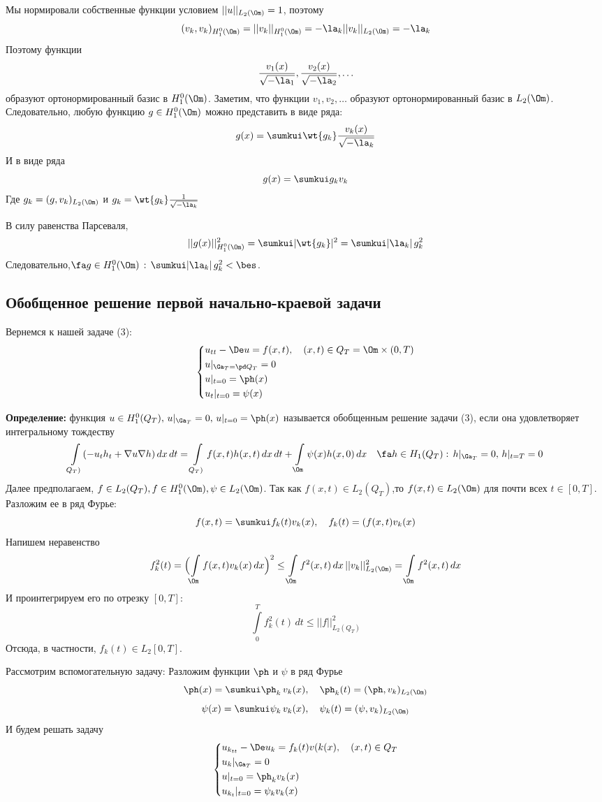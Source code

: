 \documentclass[a4paper,draft]{article}
\begin{document}
Мы нормировали собственные функции условием
$||u||_{L_2(\Om)}=1$, поэтому
$$
(v_k,v_k)_{H_1^0(\Om)}=||v_k||_{H_1^0(\Om)}=-\la_k
||v_k||_{L_2(\Om)}=-\la_k
$$
Поэтому функции
$$
\frac {v_1(x)}{\sqrt{-\la_1}}, \frac
{v_2(x)}{\sqrt{-\la_2}} ,\ldots
$$
образуют ортонормированный базис в $H_1^0(\Om)$. Заметим, что
функции $v_1,v_2,\ldots$ образуют ортонормированный базис в
$L_2(\Om)$. Следовательно, любую функцию $g\in H_1^0(\Om)$
можно представить в виде ряда:
$$
g(x)=\sumkui \wt{g_k} \frac
{v_k(x)}{\sqrt{-\la_k}}
$$
И в виде ряда
$$
g(x)=\sumkui  g_k v_k
$$
Где $g_k=(g,v_k)_{L_2(\Om)}$ и $g_k = \wt{g_k} \frac
1{\sqrt{-\la_k}}$

В силу равенства Парсеваля,
$$
||g(x)||^2_{H_1^0(\Om)}=\sumkui  |\wt{g_k}|^2 =
\sumkui  |\la_k|\, g_k^2
$$
Следовательно,$ \fa g\in H_1^0(\Om)\,: \, \sumkui
|\la_k|\, g_k^2 < \bes$.


\subsection {Обобщенное решение первой начально-краевой задачи}
Вернемся к нашей задаче (3):
$$
 \left\{
\begin{aligned}
&u_{tt}-\De u =f(x,t),\quad (x,t)\in Q_T=\Om \times (0,T)\\
&u|_{\Ga_T=\pd Q_T}= 0\\
&u|_{t=0}=\ph(x)\\
&u_t|_{t=0}=\psi(x)\\
\end{aligned}
\right.
$$

\textbf{Определение:} функция $u\in H_1^0(Q_T),\,u|_{\Ga_T}=
0,\, u|_{t=0}=\ph(x) $ называется обобщенным решение задачи
(3), если она удовлетворяет интегральному тождеству
$$
\int \limits_{Q_T)} (-u_t h_t+\nabla u \nabla h)\, dx\, dt = \int
\limits_{Q_T)} f(x,t) h(x,t)\,dx\,dt+ \int \limits_\Om \psi(x)
h(x,0)\,dx \quad \fa h\in H_1(Q_T):\,h|_{\Ga_T}= 0,\,
h|_{t=T}=0
$$
Далее предполагаем, $f\in L_2(Q_T), f\in H_1^0(\Om), \psi \in
L_2(\Om) $. Так как $f(x,t) \in L_2(Q_T)$,то $ f(x,t) \in
L_2(\Om) $ для почти всех $t \in [0,T]$. Разложим ее в ряд
Фурье:
$$
f(x,t)=\sumkui  f_k(t) v_k(x),\quad f_k (t)= (f(x,t) v_k
(x)
$$
Напишем неравенство
$$
f_k^2(t)=\Bigl( \int\limits_\Om f(x,t) v_k(x)\, dx \Bigr)^2\le
\int\limits_\Om f^2(x,t) \, dx\, ||v_k||^2_{L_2(\Om)}=
\int\limits_\Om f^2(x,t) \, dx
$$
И проинтегрируем его по отрезку $[0,T]$:
$$
\int\limits_0^T f_k^2(t) \, dt\le ||f||^2_{L_2(Q_T)}
$$
Отсюда, в частности, $f_k(t)\in L_2[0,T] $.

\noindent Рассмотрим вспомогательную задачу: Разложим функции
$\ph$ и $\psi$ в ряд Фурье
$$
\ph(x)=\sumkui  \ph_k \,v_k(x),\quad \ph_k
(t)= (\ph,v_k)_{L_2(\Om)}
$$
$$
\psi(x)=\sumkui  \psi_k \,v_k(x),\quad \psi_k (t)=
(\psi,v_k)_{L_2(\Om)}
$$
И будем решать задачу
$$
 \left\{
\begin{aligned}
&u_{k_{tt}}-\De u_k =f_k(t) v(k(x) ,\quad (x,t)\in Q_T\\
&u_k|_{\Ga_T}= 0\\
&u|_{t=0}=\ph_k v_k(x)\\
&u_{k_{t}}|_{t=0}=\psi_k v_k(x)\\
\end{aligned}
\right.
$$
\end{document}
